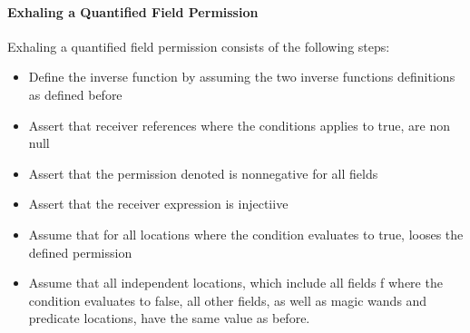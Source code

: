 \documentclass[12pt]{article}
\begin{document}
\paragraph{Exhaling a Quantified Field Permission}
Exhaling a quantified field permission consists of the following steps:
\begin{itemize}
\item Define the inverse function by assuming the two inverse functions definitions as defined before
\item Assert that receiver references where the conditions applies to true, are non null
\item Assert that the permission denoted is nonnegative for all fields
\item Assert that the receiver expression is injectiive
\item Assume that for all locations where the condition evaluates to true, looses the defined permission
\item Assume that all independent locations, which include all fields f where the condition evaluates to false, all other fields, as well as magic wands and predicate locations, have the same value as before.
\end{itemize}
\end{document}

